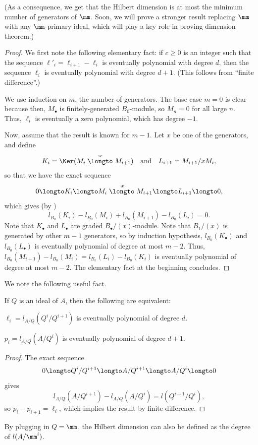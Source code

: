 (As a consequence, we get that the Hilbert dimension 
is at most the minimum number of generators of $\mm$.
Soon, we will prove a stronger result
replacing $\mm$ with any $\mm$-primary ideal,
which will play a key role in proving dimension theorem.)
\begin{proof}
    We first note the following elementary fact:
    if $c\geq 0$ is an integer such that
    the sequence $\ell'_i = \ell_{i+1}-\ell_i$
    is eventually polynomial with degree $d$,
    then the sequence $\ell_i$ is eventually polynomial
    with degree $d+1$.
    (This follows from ``finite difference''.)

    We use induction on $m$,
    the number of generators. The base case $m=0$ is clear
    because then, $M_\bullet$ is finitely-generated 
    $B_0$-module, so $M_n=0$ for all large $n$.
    Thus, $\ell_i$ is eventually a zero polynomial,
    which has degree $-1$.

    Now, assume that the result is known for $m-1$.
    Let $x$ be one of the generators, and define
    $$K_i = \Ker(M_i\stackrel{\cdot x}\longto M_{i+1})
    \quad\text{and}\quad 
    L_{i+1} = M_{i+1}/xM_i,$$ 
    so that we have the exact sequence
    $$0\longto K_i \longto M_i 
    \stackrel{\cdot x}\longto M_{i+1} 
    \longto L_{i+1}\longto 0,$$
    which gives (by )
    $$l_{B_0}(K_i) - l_{B_0}(M_i) + l_{B_0}(M_{i+1}) - l_{B_0}(L_i) = 0.$$
    Note that $K_\bullet$ and $L_\bullet$ are graded 
    $B_\bullet/(x)$-module. Note that $B_1/(x)$
    is generated by other $m-1$ generators,
    so by induction hypothesis,
    $l_{B_0}(K_\bullet)$ and $l_{B_0}(L_\bullet)$
    is eventually polynomial of degree at most $m-2$.
    Thus, $l_{B_0}(M_{i+1}) - l_{B_0}(M_i)
    = l_{B_0}(L_i) - l_{B_0}(K_i)$
    is eventually polynomial of degree at most $m-2$.
    The elementary fact at the beginning concludes.
\end{proof}
We note the following useful fact.
\begin{proposition}
    \label{prop:alternative_length}
    If $Q$ is an ideal of $A$, then the following are equivalent:
    \begin{alphenum}
    \item $\ell_i = l_{A/Q}(Q^i/Q^{i+1})$
    is eventually polynomial of degree $d$.
    \item $p_i = l_{A/Q}(A/Q^i)$
    is eventually polynomial of degree $d+1$.
    \end{alphenum}
\end{proposition}
\begin{proof}
The exact sequence
$$0\longto Q^i/Q^{i+1} \longto A/Q^{i+1}
\longto A/Q^i\longto 0$$
gives 
$$l_{A/Q}(A/Q^{i+1}) - l_{A/Q}(A/Q^i) = l(Q^{i+1}/Q^i),$$
so $p_i-p_{i+1} = \ell_i$, 
which implies the result by finite difference.
\end{proof}
By plugging in $Q=\mm$, the Hilbert dimension 
can also be defined as the degree of $l(A/\mm^i)$.

